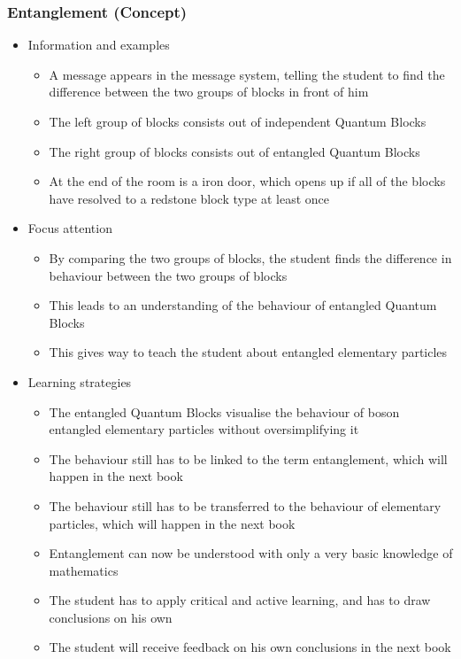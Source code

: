 \documentclass[11pt,twoside]{report} %
\begin{document}
\subsubsection{Entanglement (Concept)}
	\begin{itemize}
		\item Information and examples
		\begin{itemize}
			\item A message appears in the message system, telling the student to find the difference between the two groups of blocks in front of him
			\item The left group of blocks consists out of independent Quantum Blocks
			\item The right group of blocks consists out of entangled Quantum Blocks
			\item At the end of the room is a iron door, which opens up if all of the blocks have resolved to a redstone block type at least once
		\end{itemize}
		\item Focus attention
		\begin{itemize}
			\item By comparing the two groups of blocks, the student finds the difference in behaviour between the two groups of blocks
			\item This leads to an understanding of the behaviour of entangled Quantum Blocks
			\item This gives way to teach the student about entangled elementary particles
		\end{itemize}
		\item Learning strategies
		\begin{itemize}
			\item The entangled Quantum Blocks visualise the behaviour of boson entangled elementary particles without oversimplifying it
			\item The behaviour still has to be linked to the term entanglement, which will happen in the next book
			\item The behaviour still has to be transferred to the behaviour of elementary particles, which will happen in the next book
			\item Entanglement can now be understood with only a very basic knowledge of mathematics
			\item The student has to apply critical and active learning, and has to draw conclusions on his own
			\item The student will receive feedback on his own conclusions in the next book

\end{itemize}
\end{itemize}
\end{document}
